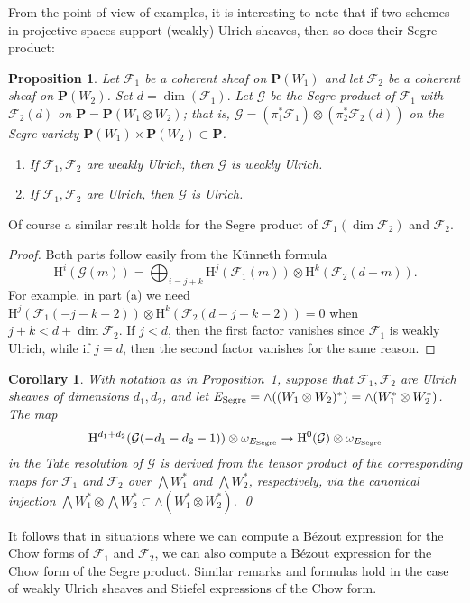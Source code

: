 \documentclass{jams-l}
\newtheorem{proposition}[theorem]{Proposition}
\newtheorem{corollary}[theorem]{Corollary}
\theoremstyle{definition}
\theoremstyle{remark}
\newcommand{\F}{{\mathcal F}}
\newcommand{\G}{{\mathcal G}}
\newcommand{\Hrm}{{\mathrm H}}
\newcommand{\PP}{{\mathbf P}}
\newcommand{\rTox}{\rightarrow}
\begin{document}
From the point of view of examples, it is interesting to note that if
two schemes in projective spaces support (weakly) Ulrich sheaves, then
so does their Segre product:

\begin{proposition}\label{Segre} 
Let $\F_1$ be a coherent sheaf on $\PP(W_1)$ and let
$\F_2$ be a coherent sheaf on $\PP(W_2)$. Set
$d= \dim(\F_1).$ Let $\G$ be the
Segre product of $\F_1$ with $\F_2(d)$ on
$\PP=\PP(W_1\otimes W_2)$; that is, 
$\G=(\pi_1^*\F_1)\otimes(\pi_2^*\F_2(d))$ on the Segre variety
$\PP(W_1)\times \PP(W_2)\subset \PP$.
\begin{enumerate}
\item[(a)] If $\F_1, \F_2$ are weakly Ulrich, then $\G$ is weakly Ulrich.
\item[(b)] If $\F_1, \F_2$ are Ulrich, then $\G$ is Ulrich.
\end{enumerate}
\end{proposition}

Of course a similar result holds for the Segre product
of $\F_1(\dim \F_2)$ and $\F_2$.

\begin{proof} Both parts follow easily from the K\"unneth formula
\[
\Hrm^i(\G(m))=\bigoplus_{i=j+k}\Hrm^j(\F_1(m))\otimes \Hrm^k(\F_2(d+m)).
\]
For example, in part (a) we need 
$\Hrm^j(\F_1(-j-k-2))\otimes \Hrm^k(\F_2(d-j-k-2))=0$
when $j+k<d+\dim \F_2$. If $j<d$, then the first factor
vanishes since $\F_1$ is weakly Ulrich, while if $j=d$,
then the second factor vanishes for the same reason.
\end{proof}

\begin{corollary}\label{product formula} 
With notation as in Proposition~\ref{Segre}, 
suppose that 
$\F_1, \F_2$ are Ulrich sheaves of dimensions $d_1, d_2$,
and let $E_{\rm Segre}=\wedge((W_1\otimes W_2)^*)=
\wedge(W_1^*\otimes W_2^*)$.
The map  
\[
\Hrm^{d_1+d_2}(\G(-d_1-d_2-1))\otimes\omega_{E_{\rm Segre}}
\rTox\Hrm^0(\G)\otimes \omega_{E_{\rm Segre}}
\]
in the Tate resolution of $\G$ 
is derived from the tensor product of the
corresponding maps for $\F_1$ and $\F_2$
over $\bigwedge W_1^*$ and $\bigwedge W_2^*$, respectively, via the
canonical injection 
$\bigwedge W_1^* \otimes \bigwedge W_2^*\subset \wedge(W_1^*\otimes W_2^*)$.
\qed
\end{corollary}

It follows that in situations where
we can compute a B\'ezout expression for the Chow forms of
$\F_1$ and $\F_2$, we can also
compute a B\'ezout expression for the Chow form of the Segre
product. Similar remarks and formulas hold in the case of 
weakly Ulrich sheaves and Stiefel expressions of the Chow form.
\end{document}
